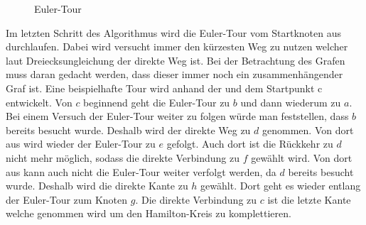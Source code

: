 \documentclass{article}
\begin{document}
\begin{figure}[H]
\centering
{}
\caption{Euler-Tour}
\label{fig:ursprungs-graf-eulertour}
\end{figure}
Im letzten Schritt des Algorithmus wird die Euler-Tour vom Startknoten aus durchlaufen. Dabei wird versucht immer den kürzesten Weg zu nutzen welcher laut Dreiecksungleichung der direkte Weg ist. Bei der Betrachtung des Grafen muss daran gedacht werden, dass dieser immer noch ein zusammenhängender  Graf ist. Eine beispielhafte Tour wird anhand der  und dem Startpunkt c entwickelt. Von $c$ beginnend geht die Euler-Tour zu $b$ und dann wiederum zu $a$. Bei einem Versuch der Euler-Tour weiter zu folgen würde man feststellen, dass $b$ bereits besucht wurde. Deshalb wird der direkte Weg zu $d$ genommen. Von dort aus wird wieder der Euler-Tour zu $e$ gefolgt. Auch dort ist die Rückkehr zu $d$ nicht mehr möglich, sodass die direkte Verbindung zu $f$ gewählt wird. Von dort aus kann auch nicht die Euler-Tour weiter verfolgt werden, da $d$ bereits besucht wurde. Deshalb wird die direkte Kante zu $h$ gewählt. Dort geht es wieder entlang der Euler-Tour zum Knoten $g$. Die direkte Verbindung zu $c$ ist die letzte Kante welche genommen wird um den Hamilton-Kreis zu komplettieren.
\end{document}

